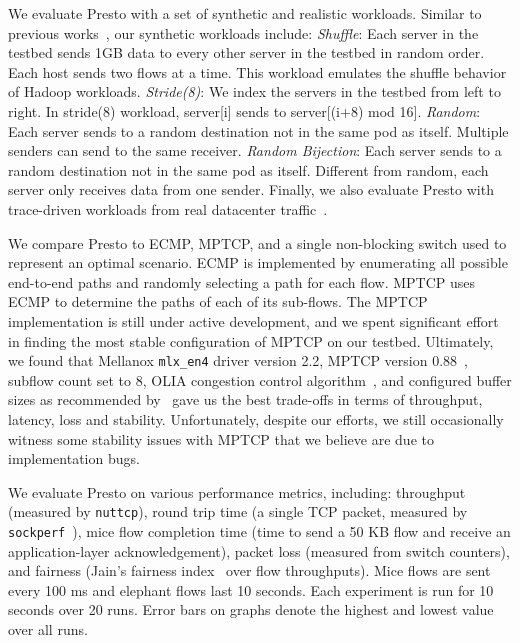 We evaluate Presto with a set of synthetic and realistic workloads. 
Similar to previous works~\cite{fattree,hedera,planck}, our synthetic workloads include:
{\em Shuffle}: Each server in the testbed sends 1GB data to every other server in the testbed in random order. 
Each host sends two flows at a time. %
This workload emulates the shuffle behavior of Hadoop workloads.
{\em Stride(8)}: We index the servers in the testbed from left to right. In stride(8) workload, server[i] sends to server[(i+8) mod 16].
{\em Random}: Each server sends to a random destination 
 not in the same pod as itself. Multiple senders can send to the same receiver.
{\em Random Bijection}: Each server sends to a random destination not in the same pod as itself. 
Different from random, each server only receives data from one sender.
Finally, we also evaluate Presto with trace-driven workloads from real datacenter traffic~\cite{kandula2009nature}.

We compare Presto to ECMP, MPTCP, and a 
single non-blocking switch used to represent an optimal scenario.
ECMP is implemented by enumerating all possible end-to-end paths and randomly selecting a path for each flow.
MPTCP uses ECMP to determine the paths of each of its sub-flows.
The MPTCP implementation is still under active development, and
we spent significant effort in finding the most stable configuration of MPTCP on our testbed. Ultimately, we found that Mellanox {\tt mlx\_en4} driver version
2.2, MPTCP version 0.88~\cite{mptcp-linux}, subflow count set to 8, OLIA congestion control algorithm~\cite{mptcp-not-optimal}, and configured buffer sizes
as recommended by~\cite{dc-mptcp,mptcp-not-optimal,paasch2013benefits} gave us the best trade-offs in terms of throughput, latency, loss and stability.
Unfortunately, despite our efforts, we still occasionally witness some stability issues 
with MPTCP that we believe are due to implementation bugs.

We evaluate Presto on various performance metrics, including: 
throughput (measured by {\tt nuttcp}), round trip time (a single TCP packet, measured by {\tt sockperf}~\cite{sockperf}), 
mice flow completion time (time to send a 50 KB flow and receive an application-layer acknowledgement), packet loss (measured from switch counters), 
and fairness (Jain's fairness index~\cite{jain-fair} over flow throughputs).  Mice flows are sent every 100 ms and elephant flows last 10 seconds. 
Each experiment is run for 10 seconds over 20 runs. Error bars on graphs denote
the highest and lowest value over all runs.

